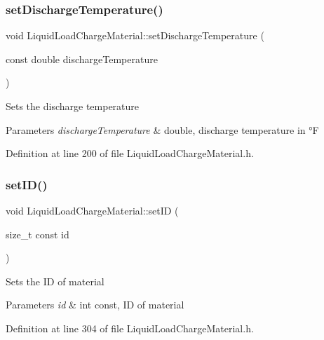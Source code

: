 \subsubsection{\texorpdfstring{set\+Discharge\+Temperature()}{setDischargeTemperature()}}
{\footnotesize\ttfamily void Liquid\+Load\+Charge\+Material\+::set\+Discharge\+Temperature (\begin{DoxyParamCaption}\item[{const double}]{discharge\+Temperature }\end{DoxyParamCaption})\hspace{0.3cm}{\ttfamily [inline]}}

Sets the discharge temperature 
\begin{DoxyParams}{Parameters}
{\em discharge\+Temperature} & double, discharge temperature in °F \\
\hline
\end{DoxyParams}


Definition at line 200 of file Liquid\+Load\+Charge\+Material.\+h.

\mbox{\label{class_liquid_load_charge_material_a3f6654f1d9387366e0ca7620ecc41361}} 
\subsubsection{\texorpdfstring{set\+I\+D()}{setID()}}
{\footnotesize\ttfamily void Liquid\+Load\+Charge\+Material\+::set\+ID (\begin{DoxyParamCaption}\item[{size\+\_\+t const}]{id }\end{DoxyParamCaption})\hspace{0.3cm}{\ttfamily [inline]}}

Sets the ID of material 
\begin{DoxyParams}{Parameters}
{\em id} & int const, ID of material \\
\hline
\end{DoxyParams}


Definition at line 304 of file Liquid\+Load\+Charge\+Material.\+h.

\mbox{\label{class_liquid_load_charge_material_ac30600ef82db69934e8c08e4a774bb03}} 
